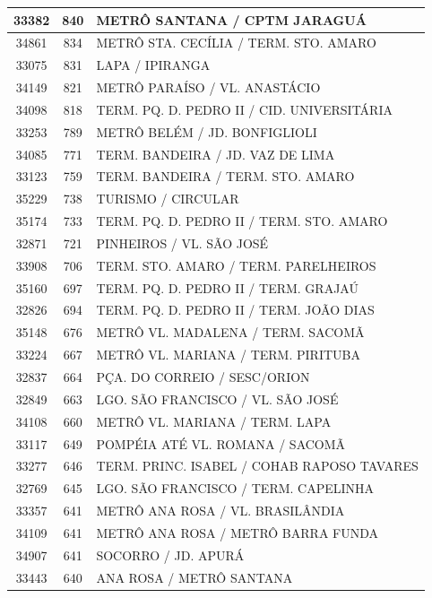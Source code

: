 \documentclass[
	12pt,				%
	oneside,			%
	a4paper,			%
	english,			%
	brazil				%
	]{abntex2ppgsi}
\begin{document}
\begin{apendicesenv}
\begin{longtable}{c|c|p{7cm}}
\hline
    33382 & 840   & METRÔ SANTANA / CPTM JARAGUÁ \\
\hline
    34861 & 834   & METRÔ STA. CECÍLIA / TERM. STO. AMARO \\
\hline
    33075 & 831   & LAPA / IPIRANGA \\
\hline
    34149 & 821   & METRÔ PARAÍSO / VL. ANASTÁCIO \\
\hline
    34098 & 818   & TERM. PQ. D. PEDRO II / CID. UNIVERSITÁRIA \\
\hline
    33253 & 789   & METRÔ BELÉM / JD. BONFIGLIOLI \\
\hline
    34085 & 771   & TERM. BANDEIRA / JD. VAZ DE LIMA \\
\hline
    33123 & 759   & TERM. BANDEIRA / TERM. STO. AMARO \\
\hline
    35229 & 738   & TURISMO / CIRCULAR \\
\hline
    35174 & 733   & TERM. PQ. D. PEDRO II / TERM. STO. AMARO \\
\hline
    32871 & 721   & PINHEIROS / VL. SÃO JOSÉ \\
\hline
    33908 & 706   & TERM. STO. AMARO / TERM. PARELHEIROS \\
\hline
    35160 & 697   & TERM. PQ. D. PEDRO II / TERM. GRAJAÚ \\
\hline
    32826 & 694   & TERM. PQ. D. PEDRO II / TERM. JOÃO DIAS \\
\hline
    35148 & 676   & METRÔ VL. MADALENA / TERM. SACOMÃ \\
\hline
    33224 & 667   & METRÔ VL. MARIANA / TERM. PIRITUBA \\
\hline
    32837 & 664   & PÇA. DO CORREIO / SESC/ORION \\
\hline
    32849 & 663   & LGO. SÃO FRANCISCO / VL. SÃO JOSÉ \\
\hline
    34108 & 660   & METRÔ VL. MARIANA / TERM. LAPA \\
\hline
    33117 & 649   & POMPÉIA ATÉ VL. ROMANA / SACOMÃ \\
\hline
    33277 & 646   & TERM. PRINC. ISABEL / COHAB RAPOSO TAVARES \\
\hline
    32769 & 645   & LGO. SÃO FRANCISCO / TERM. CAPELINHA \\
\hline
    33357 & 641   & METRÔ ANA ROSA / VL. BRASILÂNDIA \\
\hline
    34109 & 641   & METRÔ ANA ROSA / METRÔ BARRA FUNDA \\
\hline
    34907 & 641   & SOCORRO / JD. APURÁ \\
\hline
    33443 & 640   & ANA ROSA / METRÔ SANTANA \\

\end{longtable}
\end{apendicesenv}
\end{document}
